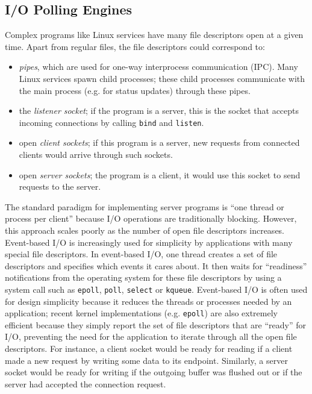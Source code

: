 \subsection{I/O Polling Engines} \label{ch3:poll}
Complex programs like Linux services have
many file descriptors open at a given time.
Apart from regular files, the file descriptors could correspond to:

\begin{itemize}
\item {\em pipes}, which are used for
  one-way interprocess communication (IPC).
  Many Linux services spawn child processes;
  these child processes communicate
  with the main process (e.g. for status
  updates) through these pipes.
\item the {\em listener socket};
  if the program is a server,
  this is the socket that accepts incoming connections
  by calling \texttt{bind} and \texttt{listen}.
\item open {\em client sockets};
  if this program is a server, 
  new requests from connected clients would arrive through
  such sockets.
\item open {\em server sockets};
  the program is a client,
  it would use this socket to send requests 
  to the server.
\end{itemize}

The standard paradigm for implementing server
programs is ``one thread or process per client''
because I/O operations are traditionally blocking.
However, this approach scales poorly as the number
of open file descriptors increases. 
Event-based I/O is increasingly used 
for simplicity by applications with
many special file descriptors.
In event-based I/O, one thread
creates a set of file descriptors
and specifies which events it cares about.
It then waits for ``readiness'' notifications 
from the operating system for
these file descriptors by using a
system call such as \texttt{epoll}, \texttt{poll},
\texttt{select} or \texttt{kqueue}. 
Event-based I/O is often used for design simplicity because it
reduces the threads or processes needed by an application; recent kernel implementations 
(e.g. \texttt{epoll}) are also extremely efficient because they 
simply report the set of file descriptors that are ``ready'' for I/O,
preventing the need for the application to iterate through all the open
file descriptors. For instance, a client socket would be ready for
reading if a client made a new request by writing some data to its
endpoint. Similarly, a server socket would be ready for 
writing if the outgoing buffer was flushed out or if the 
server had accepted the connection request.


